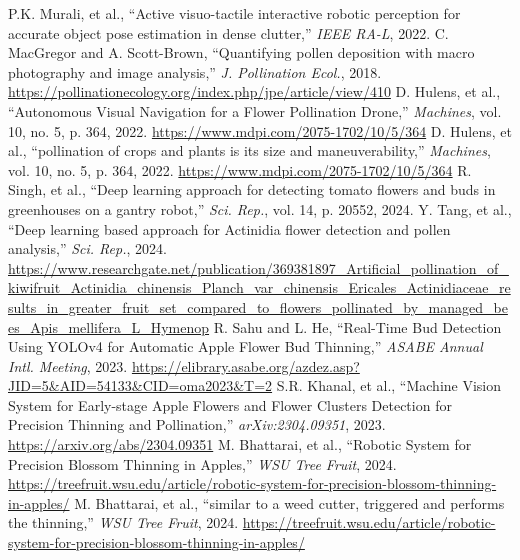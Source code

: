 \documentclass[a4paper,fleqn,10pt,twocolumn]{template_v1.0}
\begin{document}
\begin{thebibliography}{99}
P.K. Murali, et al., ``Active visuo-tactile interactive robotic perception for accurate object pose estimation in dense clutter,'' {\it IEEE RA-L}, 2022.
C. MacGregor and A. Scott-Brown, ``Quantifying pollen deposition with macro photography and image analysis,'' {\it J. Pollination Ecol.}, 2018. \url{https://pollinationecology.org/index.php/jpe/article/view/410}
D. Hulens, et al., ``Autonomous Visual Navigation for a Flower Pollination Drone,'' {\it Machines}, vol. 10, no. 5, p. 364, 2022. \url{https://www.mdpi.com/2075-1702/10/5/364}
D. Hulens, et al., ``pollination of crops and plants is its size and maneuverability,'' {\it Machines}, vol. 10, no. 5, p. 364, 2022. \url{https://www.mdpi.com/2075-1702/10/5/364}
R. Singh, et al., ``Deep learning approach for detecting tomato flowers and buds in greenhouses on a gantry robot,'' {\it Sci. Rep.}, vol. 14, p. 20552, 2024.
Y. Tang, et al., ``Deep learning based approach for Actinidia flower detection and pollen analysis,'' {\it Sci. Rep.}, 2024. \url{https://www.researchgate.net/publication/369381897_Artificial_pollination_of_kiwifruit_Actinidia_chinensis_Planch_var_chinensis_Ericales_Actinidiaceae_results_in_greater_fruit_set_compared_to_flowers_pollinated_by_managed_bees_Apis_mellifera_L_Hymenop}
R. Sahu and L. He, ``Real-Time Bud Detection Using YOLOv4 for Automatic Apple Flower Bud Thinning,'' {\it ASABE Annual Intl. Meeting}, 2023. \url{https://elibrary.asabe.org/azdez.asp?JID=5&AID=54133&CID=oma2023&T=2}
S.R. Khanal, et al., ``Machine Vision System for Early-stage Apple Flowers and Flower Clusters Detection for Precision Thinning and Pollination,'' {\it arXiv:2304.09351}, 2023. \url{https://arxiv.org/abs/2304.09351}
M. Bhattarai, et al., ``Robotic System for Precision Blossom Thinning in Apples,'' {\it WSU Tree Fruit}, 2024. \url{https://treefruit.wsu.edu/article/robotic-system-for-precision-blossom-thinning-in-apples/}
M. Bhattarai, et al., ``similar to a weed cutter, triggered and performs the thinning,'' {\it WSU Tree Fruit}, 2024. \url{https://treefruit.wsu.edu/article/robotic-system-for-precision-blossom-thinning-in-apples/}
\end{thebibliography}
\end{document}
